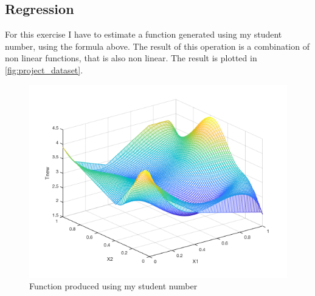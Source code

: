 \documentclass[a4paper, 10pt]{article}
\begin{document}
  \subsection{Regression}
  For this exercise I have to estimate a function generated using my student
  number, using the formula above. The result of this operation is a combination
  of non linear functions, that is also non linear. The result is plotted in 
  \autoref{fig:project_dataset}.
  \begin{figure}[htb]
    \centering
    \includegraphics[width=0.5\linewidth]{project/dataset.png}
    \caption{Function produced using my student number}
    \label{fig:project_dataset}
  \end{figure}
\end{document}
